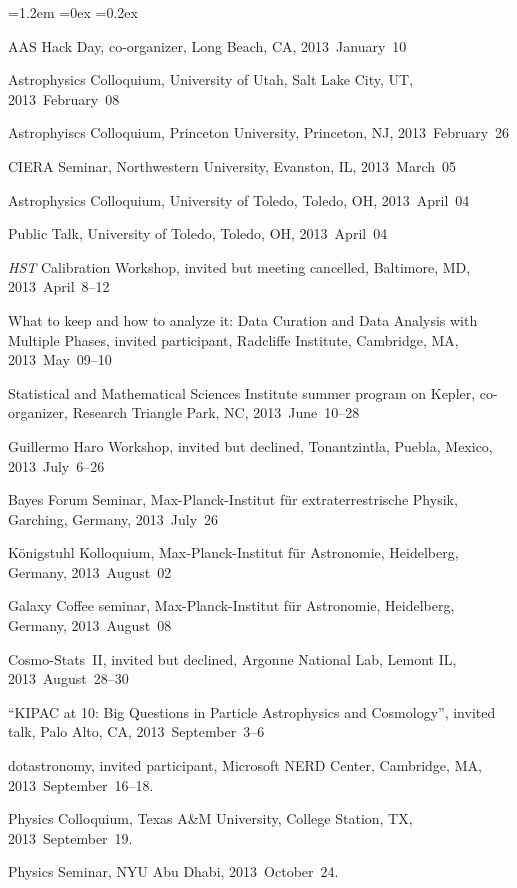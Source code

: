 \documentclass[10pt,letterpaper]{article}
\newcommand{\acronym}[1]{{\small{#1}}}
\newcommand{\project}[1]{\textsl{#1}}
\newcounter{refpubnum}
\newcommand{\hogglist}{%
    \rightmargin=0in
    \leftmargin=1.2em
    \topsep=0ex
    \partopsep=0pt
    \itemsep=0.2ex
    \parsep=0pt
    \itemindent=-1.0\leftmargin
    \listparindent=0.0\leftmargin
    \settowidth{\labelsep}{~}
    \usecounter{refpubnum}
  }
\begin{document}
\begin{list}{}{\hogglist}
{\item \acronym{AAS} Hack Day, co-organizer,
          Long Beach, CA, 2013~January~10
\item Astrophysics Colloquium, University of Utah,
          Salt Lake City, UT, 2013~February~08
\item Astrophyiscs Colloquium, Princeton University,
          Princeton, NJ, 2013~February~26
\item CIERA Seminar, Northwestern University,
          Evanston, IL, 2013~March~05
\item Astrophysics Colloquium, University of Toledo,
          Toledo, OH, 2013~April~04
\item Public Talk, University of Toledo,
          Toledo, OH, 2013~April~04
\item \project{\acronym{HST}} Calibration Workshop, invited but meeting cancelled,
          Baltimore, MD, 2013~April~8--12
\item What to keep and how to analyze it: Data Curation and Data Analysis with Multiple Phases, invited participant,
          Radcliffe Institute, Cambridge, MA, 2013~May~09--10
\item Statistical and Mathematical Sciences Institute summer program on Kepler, co-organizer,
          Research Triangle Park, NC, 2013~June~10--28
\item Guillermo Haro Workshop, invited but declined,
          Tonantzintla, Puebla, Mexico, 2013~July~6--26
\item Bayes Forum Seminar, Max-Planck-Institut f\"ur extraterrestrische Physik,
          Garching, Germany, 2013~July~26
\item K\"onigstuhl Kolloquium, Max-Planck-Institut f\"ur Astronomie,
          Heidelberg, Germany, 2013~August~02
\item Galaxy Coffee seminar, Max-Planck-Institut f\"ur Astronomie,
          Heidelberg, Germany, 2013~August~08
\item Cosmo-Stats~II, invited but declined,
          Argonne National Lab, Lemont IL, 2013~August~28--30
\item ``KIPAC at 10: Big Questions in Particle Astrophysics and Cosmology'', invited talk,
          Palo Alto, CA, 2013~September~3--6
\item dotastronomy, invited participant, Microsoft NERD Center,
          Cambridge, MA, 2013~September~16--18.
\item Physics Colloquium, Texas A&M University, 
          College Station, TX, 2013~September~19.
\item Physics Seminar, NYU Abu Dhabi, 2013~October~24.
}
\end{list}
\end{document}
